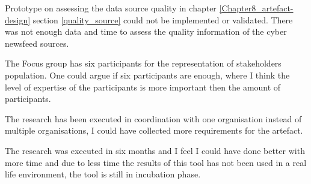 Prototype on assessing the data source quality in chapter \ref{Chapter8_artefact-design} section \ref{quality_source} could not be implemented or validated. There was not enough data and time to assess the quality information of the cyber newsfeed sources. 





The Focus group has six participants for the representation of stakeholders population.
One could argue if six participants are enough,
where I think the level of expertise of the participants
is more important then the amount of participants.

The research has been executed in coordination with one organisation  instead of multiple organisations, I could have collected more requirements for the artefact.


The research was executed in six months and I feel I could have done better with more time and due to less time the results of this tool has not been used in a real life environment, 
the tool is still in incubation phase. 

